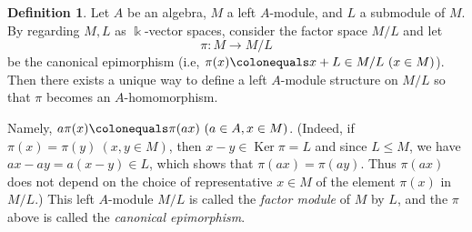 \documentclass{surv-l}
\numberwithin{equation}{chapter}
\numberwithin{figure}{chapter}
\theoremstyle{plain}
\theoremstyle{definition}
\newtheorem{dfn}[thm]{Definition}
\theoremstyle{remark}
\DeclareMathOperator{\Ker}{Ker}
\begin{document}
\begin{dfn}
Let $A$ be an algebra, $M$ a left $A$-module, and $L$ a submodule of $M$.
By regarding $M, L$ as $\Bbbk$-vector spaces, consider
the factor space $M/L$ and let
\[
\pi\colon M \to M/L
\]
be the canonical epimorphism (i.e, $\pi(x)\colonequals  x + L \in M/L\ (x \in M)$).
Then there exists a unique way to define a left $A$-module structure on $M/L$
so that $\pi$ becomes an $A$-homomorphism.

Namely, $a \pi(x)\colonequals  \pi(ax)\ (a \in A, x \in M)$.
(Indeed, if $\pi(x) = \pi(y)\ (x, y \in M)$, then
$x - y \in \Ker \pi = L$ and since $L \le M$, we have
$ax - ay = a(x - y) \in L$, which shows that $\pi(ax) = \pi(ay)$.
Thus $\pi(ax)$ does not depend on the choice of representative $x \in M$
of the element $\pi(x)$ in $M/L$.)
This left $A$-module $M/L$ is called the \emph{factor module} of $M$ by $L$,
and the $\pi$ above is called the \emph{canonical epimorphism}.

\end{dfn}
\end{document}
